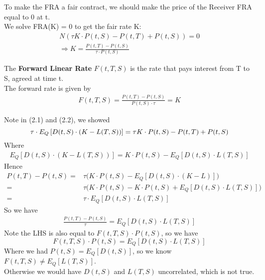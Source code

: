 To make the FRA a fair contract, we should make the price of the Receiver FRA equal to 0 at t.\\
We solve FRA(K) = 0 to get the fair rate K:
\begin{align*}
    N (\tau K \cdot P(t, S) - P(t, T) + P(t, S)) = 0 \\
    \Rightarrow K = \frac{P(t, T) - P(t, S)}{\tau \cdot P(t, S)}
\end{align*}

\begin{definition}
    The \textbf{Forward Linear Rate} $F(t, T, S)$ is the rate that pays interest from T to S, agreed at time t. \\
    The forward rate is given by
    \begin{align*}
        F(t, T, S) = \frac{P(t, T) - P(t, S)}{P(t, S) \cdot \tau} = K
    \end{align*}
\end{definition}

Note in (2.1) and (2.2), we showed
\begin{equation}
    \tau \cdot E_Q\left[ D(t, S) \cdot (K - L(T, S)) \right] = \tau K \cdot P(t, S) - P(t, T) + P(t, S) \notag
\end{equation}
Where
\begin{align*}
    E_Q\left[ D(t, S) \cdot (K - L(T, S)) \right] = K \cdot P(t, S) - E_Q\left[ D(t, S) \cdot L(T, S) \right]
\end{align*}
Hence
\begin{align*}
    P(t, T) - P(t, S) =& \tau \big( K \cdot P(t, S) - E_Q\left[ D(t, S) \cdot (K - L) \right] \big)\\
    =& \tau \big( K \cdot P(t, S) - K \cdot P(t, S) + E_Q\left[ D(t, S) \cdot L(T, S) \right] \big)\\
    =& \tau \cdot E_Q\left[ D(t, S) \cdot L(T, S) \right]
\end{align*}
So we have
\begin{align*}
    \frac{P(t, T) - P(t, S)}{\tau} = E_Q\left[ D(t, S) \cdot L(T, S) \right]
\end{align*}
Note the LHS is also equal to $F(t, T, S) \cdot P(t, S)$, so we have
\begin{equation}
    F(t, T, S) \cdot P(t, S) = E_Q\left[ D(t, S) \cdot L(T, S) \right]
\end{equation}
Where we had $P(t, S) = E_Q\left[ D(t, S) \right] $, so we know $ F(t, T, S) \neq E_Q\left[ L(T, S) \right] $.\\
Otherwise we would have $D(t, S)$ and $L(T, S)$ uncorrelated, which is not true.

